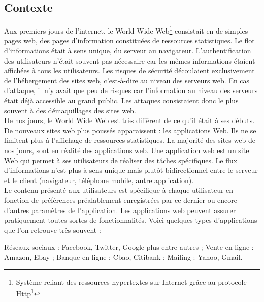 \subsection{Contexte}
Aux premiers jours de l’internet, le World Wide Web\footnote{Système reliant des ressources hypertextes sur Internet grâce au protocole Http\footnote{L'Hypertext Transfer Protocol, plus connu sous l'abréviation HTTP, littéralement « protocole de transfert hypertexte » est un protocole de communication client-serveur développé pour le World Wide Web}}  consistait en de simples pages web, des pages d’information constituées de ressources statistiques. Le flot d'informations était à sens unique, du serveur au navigateur. L’authentification des utilisateurs n’était souvent pas nécessaire car les mêmes informations étaient affichées à tous les utilisateurs. Les risques de sécurité découlaient exclusivement de l’hébergement des sites web, c’est-à-dire au niveau des serveurs web. En cas d’attaque, il n’y avait que peu de risques car l’information au niveau des serveurs était déjà accessible au grand public. Les attaques consistaient donc le plus souvent à des démaquillages des sites web.\\
De nos jours, le World Wide Web est très différent de ce qu’il était à ses débuts. De nouveaux sites web plus poussés apparaissent : les applications Web. Ils ne se limitent plus à l’affichage de ressources statistiques. La majorité des sites web de nos jours, sont en réalité des applications web. Une application web est un site Web qui permet à ses utilisateurs de réaliser des tâches spécifiques. Le flux d’informations n’est plus à sens unique mais plutôt bidirectionnel entre le serveur et le client (navigateur, téléphone mobile, autre application).\\
Le contenu présenté aux utilisateurs est spécifique à chaque utilisateur en fonction de préférences préalablement enregistrées par ce dernier ou encore d’autres paramètres de l’application. Les applications web peuvent assurer pratiquement toutes sortes de fonctionnalités. Voici quelques types d’applications que l’on retrouve très souvent :
\begin{itemize}
	\itemtirait Réseaux sociaux : Facebook, Twitter, Google plus entre autres ;
	\itemtirait Vente en ligne : Amazon, Ebay ;
	\itemtirait Banque en ligne : Cbao, Citibank ;
	\itemtirait Mailing : Yahoo, Gmail.
\end{itemize}
